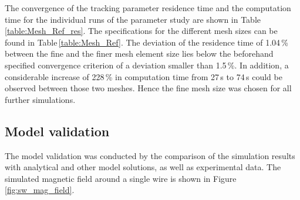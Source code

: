 The convergence of the tracking parameter residence time and the computation time for the individual runs of the parameter study are shown in Table\,\ref{table:Mesh_Ref_res}. The specifications for the different mesh sizes can be found in Table\,\ref{table:Mesh_Ref}. The deviation of the residence time of 1.04\,\% between the fine and the finer mesh element size lies below the beforehand specified convergence criterion of a deviation smaller than 1.5\,\%. In addition, a considerable increase of 228\,\% in computation time from 27\,s to 74\,s could be observed between those two meshes. Hence the fine mesh size was chosen for all further simulations. 


\FloatBarrier

\subsection{Model validation}
\label{subsec:mod_val}

The model validation was conducted by the comparison of the simulation results with analytical and other model solutions, as well as experimental data.
The simulated magnetic field around a single wire is shown in Figure\,\ref{fig:sw_mag_field}. 

